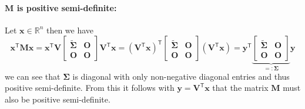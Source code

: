 \documentclass{article}
\newcommand\tr{\mathsf{T}}
\begin{document}
\paragraph{$\mathbf{M}$ is positive semi-definite:} Let $\mathbf{x}\in\mathbb{R}^{n}$ then we have
\begin{equation*}
\mathbf{x}^{\tr}\mathbf{M}\mathbf{x} = 
   \mathbf{x} ^{\tr}\mathbf{V}\begin{bmatrix}
        \mathbf{\tilde{\Sigma}} &\mathbf{O} \\
        \mathbf{O} & \mathbf{O}
    \end{bmatrix}\mathbf{V}^{\tr} \mathbf{x} = \left(\mathbf{V}^{\tr}\mathbf{x}\right)^{\tr}\begin{bmatrix}
        \mathbf{\tilde{\Sigma}} &\mathbf{O} \\
        \mathbf{O} & \mathbf{O}
    \end{bmatrix} \left(\mathbf{V}^{\tr}\mathbf{x}\right) = \mathbf{y}^{\tr}\underbrace{\begin{bmatrix}
        \mathbf{\tilde{\Sigma}} &\mathbf{O} \\
        \mathbf{O} & \mathbf{O}
    \end{bmatrix}}_{=: \mathbf{\Sigma}}\mathbf{y}
\end{equation*}
we can see that $\mathbf{\Sigma}$ is diagonal with only non-negative diagonal entries and thus positive semi-definite. From this it follows with $\mathbf{y} = \mathbf{V}^{\tr}\mathbf{x}$ that the matrix $\mathbf{M}$ must also be positive semi-definite. 
\end{document}
